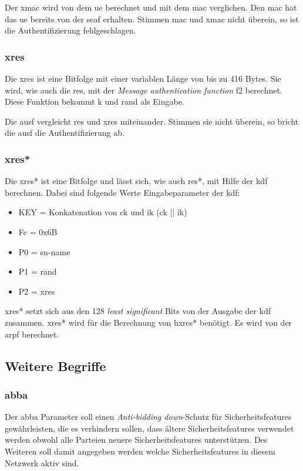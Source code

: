 Der \gls{xmac} wird von dem \gls{ue} berechnet und mit dem \gls{mac} verglichen. 
Den \gls{mac} hat das \gls{ue} bereits von der \gls{seaf} erhalten.
Stimmen \gls{mac} und \gls{xmac} nicht überein, so ist die Authentifizierung fehlgeschlagen. %

\subsubsection{\gls{xres}}
Die \gls{xres} ist eine Bitfolge mit einer variablen Länge von bis zu 416 Bytes. %
Sie wird, wie auch die \gls{res}, mit der \textit{Message authentication function} f2 berechnet. 
Diese Funktion bekommt \gls{k} und \gls{rand} als Eingabe. %

Die \gls{ausf} vergleicht \gls{res} und \gls{xres} miteinander.
Stimmen sie nicht überein, so bricht die \gls{ausf} die Authentifizierung ab. %

\subsubsection{\gls{xres*}}
Die \gls{xres*} ist eine Bitfolge und lässt sich, wie auch \gls{res*}, mit Hilfe der \gls{kdf} berechnen.
Dabei sind folgende Werte Eingabeparameter der \gls{kdf}: %
\begin{itemize}
\item KEY = Konkatenation von \gls{ck} und \gls{ik} (\gls{ck} || \gls{ik})
\item Fc = 0x6B
\item P0 = \gls{sn-name}
\item P1 = \gls{rand}
\item P2 = \gls{xres}
\end{itemize}

\gls{xres*} setzt sich aus den 128 \textit{least significant} Bits von der Ausgabe der \gls{kdf} zusammen.
\gls{xres*} wird für die Berechnung von \gls{hxres*} benötigt.
Es wird von der \gls{arpf} berechnet.


\subsection{Weitere Begriffe}

\subsubsection{\gls{abba}}
Der \gls{abba} Parameter soll einen \textit{Anti-bidding down}-Schutz für Sicherheitsfeatures gewährleisten, die es verhindern sollen, dass ältere Sicherheitsfeatures verwendet werden obwohl alle Parteien neuere Sicherheitsfeatures unterstützen. %
Des Weiteren soll damit angegeben werden welche Sicherheitsfeatures in diesem Netzwerk aktiv sind.

